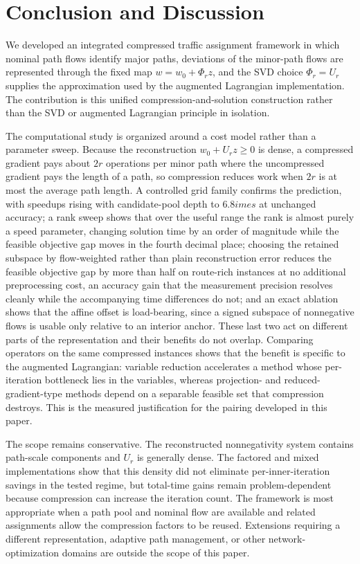 \documentclass[11pt]{article}
\begin{document}
\section{Conclusion and Discussion}
\label{sec:conclusion}
{\color{red}
We developed an integrated compressed traffic assignment framework in which nominal path flows identify major paths, deviations of the minor-path flows are represented through the fixed map $w=w_0+\Phi_rz$, and the SVD choice $\Phi_r=U_r$ supplies the approximation used by the augmented Lagrangian implementation. The contribution is this unified compression-and-solution construction rather than the SVD or augmented Lagrangian principle in isolation.

The computational study is organized around a cost model rather than a parameter sweep. Because the reconstruction $w_0+U_rz\ge0$ is dense, a compressed gradient pays about $2r$ operations per minor path where the uncompressed gradient pays the length of a path, so compression reduces work when $2r$ is at most the average path length. A controlled grid family confirms the prediction, with speedups rising with candidate-pool depth to $6.8	imes$ at unchanged accuracy; a rank sweep shows that over the useful range the rank is almost purely a speed parameter, changing solution time by an order of magnitude while the feasible objective gap moves in the fourth decimal place; choosing the retained subspace by flow-weighted rather than plain reconstruction error reduces the feasible objective gap by more than half on route-rich instances at no additional preprocessing cost, an accuracy gain that the measurement precision resolves cleanly while the accompanying time differences do not; and an exact ablation shows that the affine offset is load-bearing, since a signed subspace of nonnegative flows is usable only relative to an interior anchor. These last two act on different parts of the representation and their benefits do not overlap. Comparing operators on the same compressed instances shows that the benefit is specific to the augmented Lagrangian: variable reduction accelerates a method whose per-iteration bottleneck lies in the variables, whereas projection- and reduced-gradient-type methods depend on a separable feasible set that compression destroys. This is the measured justification for the pairing developed in this paper.

The scope remains conservative. The reconstructed nonnegativity system contains path-scale components and $U_r$ is generally dense. The factored and mixed implementations show that this density did not eliminate per-inner-iteration savings in the tested regime, but total-time gains remain problem-dependent because compression can increase the iteration count. The framework is most appropriate when a path pool and nominal flow are available and related assignments allow the compression factors to be reused. Extensions requiring a different representation, adaptive path management, or other network-optimization domains are outside the scope of this paper.
}
\end{document}
